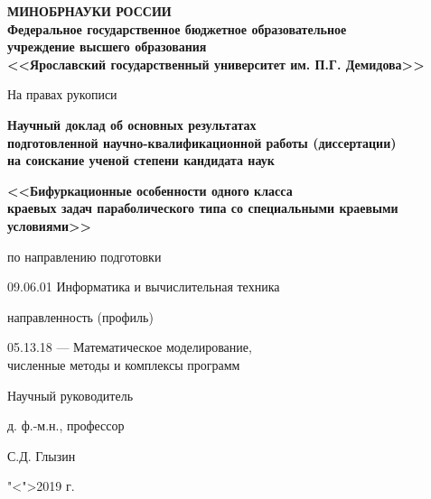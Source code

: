 \documentclass[12pt]{extarticle}
\begin{document}
\thispagestyle{empty}

\begin{center}

\textbf{МИНОБРНАУКИ РОССИИ\\
Федеральное государственное бюджетное образовательное \\
учреждение высшего образования\\
<<Ярославский государственный университет им. П.Г. Демидова>>\\}

\vspace{1cm}

\hspace{22em} На правах рукописи

\vspace{1cm}

\textbf{Научный доклад об основных результатах \\
подготовленной научно-квалификационной работы (диссертации) \\
на соискание ученой степени кандидата наук}

\vspace{0.5cm}

{\large
\textbf{<<Бифуркационные особенности одного класса \\
краевых задач параболического
типа со специальными краевыми условиями>>}
}

\vspace{1cm}

по направлению подготовки

\vspace{0.5cm}

09.06.01 Информатика и вычислительная техника

\vspace{1cm}

направленность (профиль)

\vspace{0.5cm}

05.13.18 --- Математическое моделирование, \\ 
численные методы и комплексы программ

\vspace{1cm}

\end{center}
	
\hspace{16em} Научный руководитель\par
\hspace{16em} д. ф.-м.н., профессор\par
\hspace{16em} \underline{\hspace{5cm}}С.Д. Глызин \par
\hspace{16em} "<\underline{\hspace{0.9cm}}">\underline{\hspace{4.9cm}}2019 г.\par
	
\end{document}
